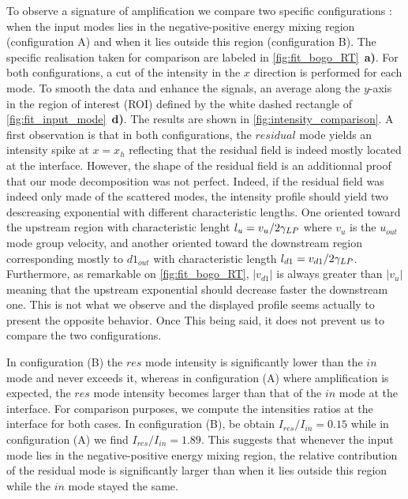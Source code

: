 To observe a signature of amplification we compare two specific configurations : when the input modes lies in the negative-positive energy mixing region (configuration A) and when it lies outside this region (configuration B). The specific 
realisation taken for comparison are labeled in \autoref{fig:fit_bogo_RT}~\textbf{a)}. For both configurations, a cut of the intensity in the $x$ direction is performed for each mode. To smooth the data and enhance the signals, an average along the $y$-axis in the region of interest (ROI) defined by the white dashed rectangle of \autoref{fig:fit_input_mode}~\textbf{d)}. 
The results are shown in \autoref{fig:intensity_comparison}. A first observation is that in both configurations, the $residual$ mode yields an intensity spike at $x=x_h$ reflecting that the residual field is indeed mostly located at the interface. However, the shape of the residual field is an additionnal proof
that our mode decomposition was not perfect. Indeed, if the residual field was indeed only made of the scattered modes, the intensity profile should yield two descreasing exponential with different characteristic lengths.
One oriented toward the upstream region with characteristic lenght $l_u=v_u/2\gamma_{LP}$ where $v_u$ is the $u_{out}$ mode group velocity, and another oriented toward the downstream region corresponding mostly to $d1_{out}$ with characteristic length $l_{d1}=v_{d1}/2\gamma_{LP}$. Furthermore, as remarkable on
\autoref{fig:fit_bogo_RT}, $|v_{d1}|$ is always greater than $|v_u|$ meaning that the upstream exponential should decrease faster the downstream one. This is not what we observe and the displayed profile seems actually to present the opposite behavior. Once 
This being said, it does not prevent us to compare the two configurations.


In configuration (B) the $res$ mode intensity is significantly lower than the $in$ mode and never exceeds it, whereas in configuration (A) where amplification is expected, the $res$ mode intensity becomes larger than that of the $in$ mode at the interface.
For comparison purposes, we compute the intensities ratios at the interface for both cases. In configuration (B), be obtain $I_{res}/I_{in} = 0.15$ while in configuration (A) we find $I_{res}/I_{in} = 1.89$. This suggests that whenever the input mode lies in the negative-positive energy mixing region, the relative contribution of the residual mode
is significantly larger than when it lies outside this region while the $in$ mode stayed the same. 

